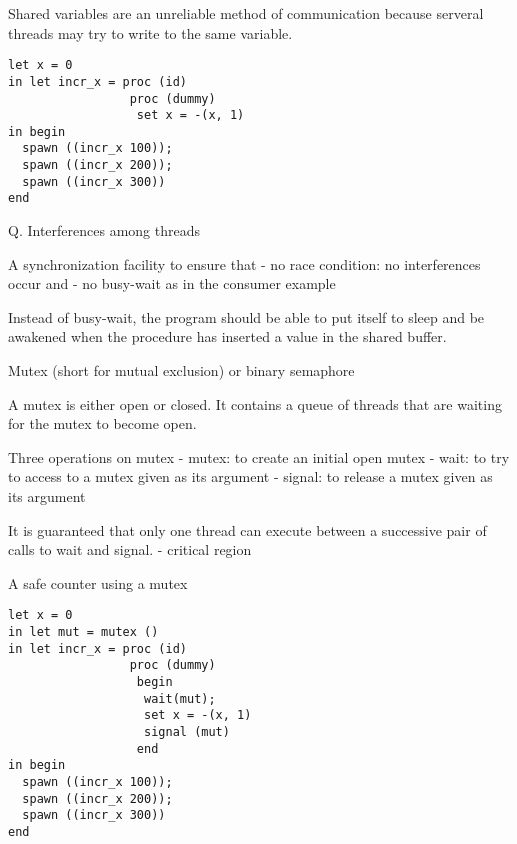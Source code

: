 \documentclass{article}
\begin{document}
\begin{huge}

Shared variables are an unreliable method of communication because serveral threads may try to write to the same variable.

\begin{lstlisting}
let x = 0
in let incr_x = proc (id)
                 proc (dummy)
                  set x = -(x, 1)
in begin
  spawn ((incr_x 100));
  spawn ((incr_x 200));
  spawn ((incr_x 300))
end             
\end{lstlisting}

Q. Interferences among threads


A synchronization facility to ensure that \al
- no race condition: no interferences occur and \al
- no busy-wait as in the consumer example

Instead of busy-wait, the program should be able to put itself to sleep and be awakened when the procedure has inserted a value in the shared buffer.



Mutex (short for mutual exclusion) or binary semaphore

A mutex is either open or closed. It contains a queue of threads that are waiting for the mutex to become open. 

Three operations on mutex \al
- mutex: to create an initial open mutex \al
- wait: to try to access to a mutex given as its argument \al
- signal: to release a mutex given as its argument \al

It is guaranteed that only one thread can execute between a successive pair of calls to wait and signal. \al
- critical region


A safe counter using a mutex
\begin{lstlisting}
let x = 0
in let mut = mutex ()
in let incr_x = proc (id)
                 proc (dummy)
                  begin
                   wait(mut);
                   set x = -(x, 1)
                   signal (mut)
                  end
in begin
  spawn ((incr_x 100));
  spawn ((incr_x 200));
  spawn ((incr_x 300))
end             
\end{lstlisting}


\end{huge}
\end{document}
